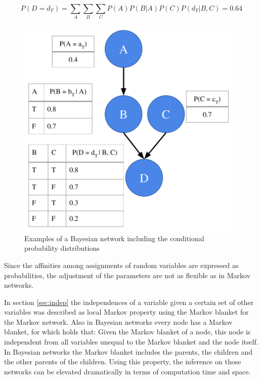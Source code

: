 \begin{equation}
P(D = d_T)=\sum_A{\sum_B{\sum_C{P(A)P(B|A)P(C)P(d_T|B,C)}}} = 0.64
\label{eq:bayes}
\end{equation}

\begin{figure}[htpb]
  \centering
  	\includegraphics[scale=0.6]{img/bayes.pdf} 
  \caption{Examples of a Bayesian network including the conditional probability distributions}
  \label{fig:bayes}
\end{figure}

Since the affinities among assignments of random variables are expressed as probabilities, the adjustment of the parameters are not as flexible as in Markov networks.

In section \ref{sec:indep} the independences of a variable given a certain set of other variables was described as local Markov property using the Markov blanket for the Markov network. Also in Bayesian networks every node has a Markov blanket, for which holds that: Given the Markov blanket of a node, this node is independent from all variables unequal to the Markov blanket and the node itself. In Bayesian networks the Markov blanket includes the parents, the children and the other parents of the children. Using this property, the inference on those networks can be elevated dramatically in terms of computation time and space.


